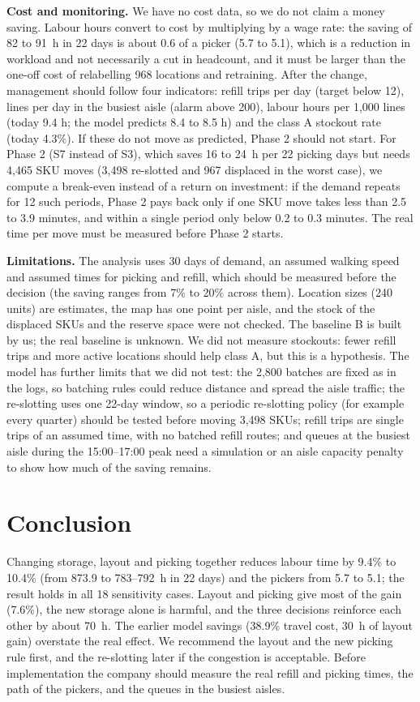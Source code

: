 \documentclass[conference]{IEEEtran}
\begin{document}
\textbf{Cost and monitoring.} We have no cost data, so we do not claim a money saving. Labour hours convert to cost by multiplying by a wage rate: the saving of 82 to 91~h in 22 days is about 0.6 of a picker (5.7 to 5.1), which is a reduction in workload and not necessarily a cut in headcount, and it must be larger than the one-off cost of relabelling 968 locations and retraining. After the change, management should follow four indicators: refill trips per day (target below 12), lines per day in the busiest aisle (alarm above 200), labour hours per 1,000 lines (today 9.4 h; the model predicts 8.4 to 8.5 h) and the class A stockout rate (today 4.3\%). If these do not move as predicted, Phase 2 should not start. For Phase 2 (S7 instead of S3), which saves 16 to 24~h per 22 picking days but needs 4,465 SKU moves (3,498 re-slotted and 967 displaced in the worst case), we compute a break-even instead of a return on investment: if the demand repeats for 12 such periods, Phase 2 pays back only if one SKU move takes less than 2.5 to 3.9 minutes, and within a single period only below 0.2 to 0.3 minutes. The real time per move must be measured before Phase 2 starts.

\textbf{Limitations.} The analysis uses 30 days of demand, an assumed walking speed and assumed times for picking and refill, which should be measured before the decision (the saving ranges from 7\% to 20\% across them). Location sizes (240 units) are estimates, the map has one point per aisle, and the stock of the displaced SKUs and the reserve space were not checked. The baseline B is built by us; the real baseline is unknown. We did not measure stockouts: fewer refill trips and more active locations should help class A, but this is a hypothesis. The model has further limits that we did not test: the 2,800 batches are fixed as in the logs, so batching rules could reduce distance and spread the aisle traffic; the re-slotting uses one 22-day window, so a periodic re-slotting policy (for example every quarter) should be tested before moving 3,498 SKUs; refill trips are single trips of an assumed time, with no batched refill routes; and queues at the busiest aisle during the 15:00--17:00 peak need a simulation or an aisle capacity penalty to show how much of the saving remains.

\section{Conclusion}
Changing storage, layout and picking together reduces labour time by 9.4\% to 10.4\% (from 873.9 to 783--792~h in 22 days) and the pickers from 5.7 to 5.1; the result holds in all 18 sensitivity cases. Layout and picking give most of the gain (7.6\%), the new storage alone is harmful, and the three decisions reinforce each other by about 70~h. The earlier model savings (38.9\% travel cost, 30~h of layout gain) overstate the real effect. We recommend the layout and the new picking rule first, and the re-slotting later if the congestion is acceptable. Before implementation the company should measure the real refill and picking times, the path of the pickers, and the queues in the busiest aisles.


\end{document}
